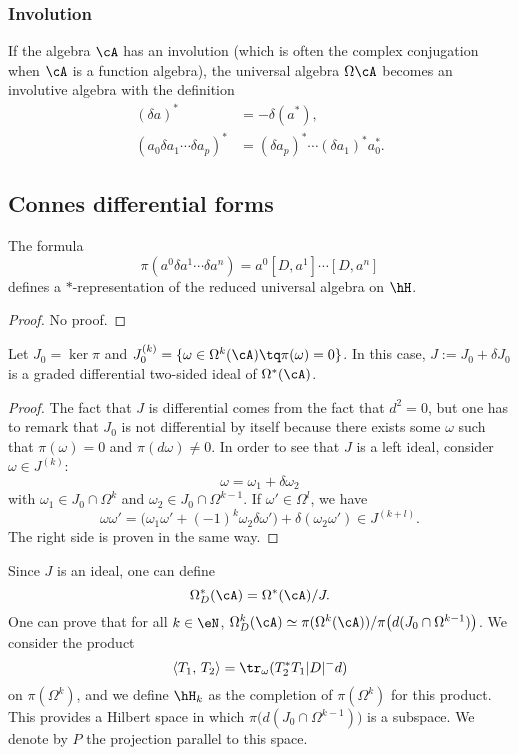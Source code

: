 \subsubsection{Involution}

If the algebra $\cA$ has an involution (which is often the complex conjugation when $\cA$ is a function algebra), the universal algebra $\Omega\cA$ becomes an involutive algebra with the definition
\begin{align*}
(\delta a)^*&=-\delta(a^*),\\
(a_0\delta a_1\cdots\delta a_p)^*&=(\delta a_p)^*\cdots(\delta a_1)^*a_0^*.
\end{align*}


\subsection{Connes differential forms}

\begin{proposition}
The formula
\[
  \pi(a^0\delta a^1\cdots \delta a^{n})=a^0[D,a^1]\cdots[D,a^{n}]
\]
defines a $*$-representation of the reduced universal algebra on $\hH$.
\end{proposition}
\begin{proof}
No proof.
\end{proof}

\begin{proposition}
Let $J_0=\ker\pi$ and $J_0^{(k)}=\{ \omega\in\Omega^k(\cA)\tq \pi(\omega)=0 \}$. In this case, $J:=J_0+\delta J_0$ is a graded differential two-sided ideal of $\Omega^*(\cA)$.
\end{proposition}

\begin{proof}
The fact that $J$ is differential comes from the fact that $d^2=0$, but one has to remark that $J_0$ is not differential by itself because there exists some  $\omega$ such that $\pi(\omega)=0$ and $\pi(d\omega)\neq 0$. In order to see that $J$ is a left ideal, consider $\omega\in J^{(k)}$:
\[
  \omega=\omega_1+\delta\omega_2
\]
with $\omega_1\in J_0\cap\Omega^k$ and $\omega_2\in J_0\cap\Omega^{k-1}$. If $\omega'\in\Omega^l$, we have
\[
  \omega\omega'=\big( \omega_1\omega'+(-1)^k\omega_2\delta\omega' \big)+\delta(\omega_2\omega')\in J^{(k+l)}.
\]
The right side is proven in the same way.
\end{proof}

Since $J$ is an ideal, one can define
\[
  \Omega^*_D(\cA)=\Omega^*(\cA)/J.
\]
One can prove that for all $k\in\eN$, $\Omega^k_D(\cA)\simeq \pi(\Omega^k(\cA))/\pi\big( d(J_0\cap\Omega^{k-1}) \big)$. We consider the product
\begin{equation}
	\langle T_1,\,T_2\rangle=\tr_{\omega}(T_2^*T_1| D |^-d)
\end{equation}
on $\pi(\Omega^k)$, and we define $\hH_k$ as the completion of $\pi(\Omega^k)$ for this product. This provides a Hilbert space in which $\pi\big( d(J_0\cap\Omega^{k-1}) \big)$ is a subspace. We denote by $P$ the projection parallel to this space.

